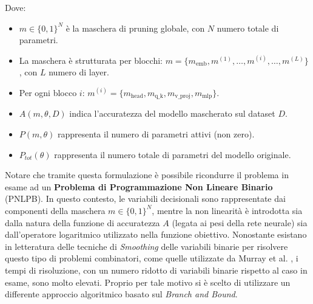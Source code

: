Dove:
\begin{itemize}
    \item $m \in \{0, 1\}^N$ è la maschera di pruning globale, con $N$ numero totale di parametri.
    \item La maschera è strutturata per blocchi: $m = \{m_{\mathrm{emb}}, m^{(1)}, \dots,
              m^{(i)}, \dots, m^{(L)}\}$, con $L$ numero di layer.
    \item Per ogni blocco $i$: $m^{(i)} = \{m_{\mathrm{head}}, m_{\mathrm{q\_k}},
              m_{\mathrm{v\_proj}}, m_{\mathrm{mlp}}\}$.
    \item ${A}(m, \theta, D)$ indica l'accuratezza del modello mascherato sul dataset $D$.
    \item ${P}(m, \theta)$ rappresenta il numero di parametri attivi (non zero).
    \item ${P}_{tot}(\theta)$ rappresenta il numero totale di parametri del modello originale.
\end{itemize}
Notare che tramite questa formulazione è possibile ricondurre il problema in esame ad un \textbf{Problema di Programmazione Non Lineare Binario} (PNLPB). In questo contesto, le variabili decisionali sono rappresentate dai componenti della maschera $m \in \{0, 1\}^N$, mentre la non linearità è introdotta sia dalla natura della funzione di accuratezza ${A}$ (legata ai pesi della rete neurale) sia dall'operatore logaritmico utilizzato nella funzione obiettivo. Nonostante esistano in letteratura delle tecniche di \textit{Smoothing} delle variabili binarie per risolvere questo tipo di problemi combinatori, come quelle utilizzate da Murray et al. \cite{nonlinear_optim}, i tempi di risoluzione, con un numero ridotto di variabili binarie rispetto al caso in esame, sono molto elevati. Proprio per tale motivo si è scelto di utilizzare un differente approccio algoritmico basato sul \textit{Branch and Bound}. \newline

